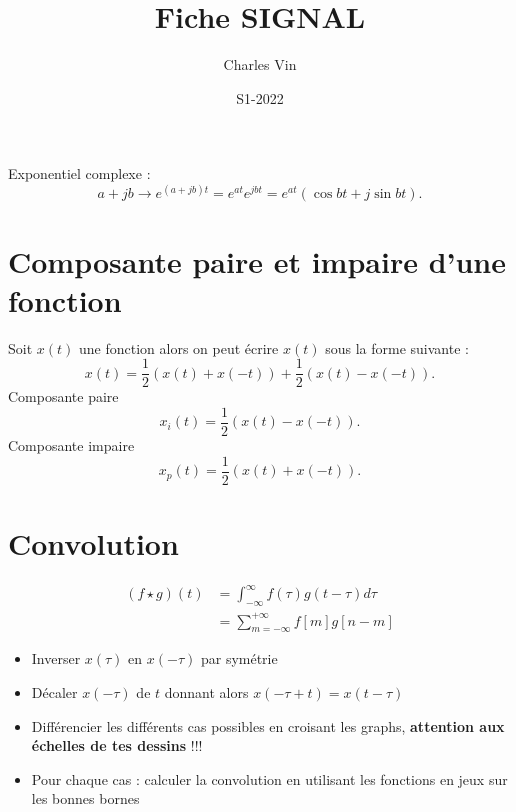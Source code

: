 \documentclass{article}
\title{Fiche SIGNAL}
\author{Charles Vin}
\date{S1-2022}
\theoremstyle{plain}%
\theoremstyle{definition}
\theoremstyle{remark}
\begin{document}
\maketitle
\tableofcontents

Exponentiel complexe : 
\[
    a + jb \to e^{(a+jb)t} = e^{at}e^{jbt} = e^{at}(\cos bt + j \sin bt)
.\]

\section{Composante paire et impaire d'une fonction}
Soit $ x(t) $ une fonction alors on peut écrire $ x(t) $ sous la forme suivante : 
\[
    x(t) = \frac{1}{2}(x(t) + x(-t)) + \frac{1}{2}(x(t) - x(-t))
.\]
Composante paire 
\[
    x_i(t) = \frac{1}{2}(x(t) - x(-t))
.\]
Composante impaire 
\[
    x_p(t) = \frac{1}{2}(x(t) + x(-t))
.\]

\section{Convolution}
\begin{align*}
    (f \star g)(t) &= \int _{-\infty }^{\infty }f(\tau )g(t-\tau )d\tau \\
                    &= \sum_{m=-\infty }^{+\infty} f[m]g[n - m]
\end{align*}

\begin{itemize}
    \item Inverser $ x(\tau ) $ en $ x(-\tau) $ par symétrie
    \item Décaler $ x(-\tau) $ de $ t $ donnant alors $ x(- \tau + t ) = x(t - \tau )$ 
    \item Différencier les différents cas possibles en croisant les graphs, \textbf{attention aux échelles de tes dessins} !!! 
    \item Pour chaque cas : calculer la convolution en utilisant les fonctions en jeux sur les bonnes bornes
\end{itemize}
\end{document}
